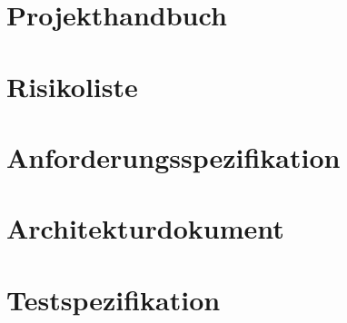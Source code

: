 \section{Projekthandbuch}  \label{Projekthandbuch}

\section{Risikoliste}  \label{Risikoliste}

\section{Anforderungsspezifikation}  \label{Anforderungsspezifikation}


\section{Architekturdokument}  \label{Architekturdokument}

\section{Testspezifikation}  \label{Testspezifikation}